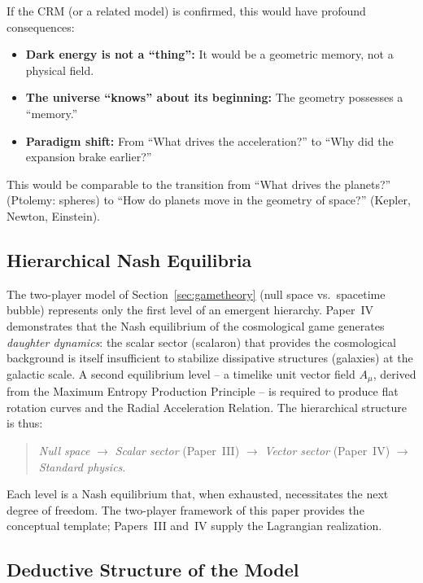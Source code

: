 \documentclass[aps,prd,twocolumn,superscriptaddress,nofootinbib]{revtex4-2}
\begin{document}
If the CRM (or a related model) is confirmed, this would have profound consequences:

\begin{itemize}
\item \textbf{Dark energy is not a ``thing'':} It would be a geometric memory, not a physical field.
\item \textbf{The universe ``knows'' about its beginning:} The geometry possesses a ``memory.''
\item \textbf{Paradigm shift:} From ``What drives the acceleration?'' to ``Why did the expansion brake earlier?''
\end{itemize}

This would be comparable to the transition from ``What drives the planets?'' (Ptolemy: spheres) to ``How do planets move in the geometry of space?'' (Kepler, Newton, Einstein).

\subsection{Hierarchical Nash Equilibria}
\label{subsec:hierarchical_nash}

The two-player model of Section~\ref{sec:gametheory} (null space vs.\ spacetime bubble) represents only the first level of an emergent hierarchy. Paper~IV \cite{Geiger2026d} demonstrates that the Nash equilibrium of the cosmological game generates \emph{daughter dynamics}: the scalar sector (scalaron) that provides the cosmological background is itself insufficient to stabilize dissipative structures (galaxies) at the galactic scale. A second equilibrium level -- a timelike unit vector field $A_\mu$, derived from the Maximum Entropy Production Principle -- is required to produce flat rotation curves and the Radial Acceleration Relation. The hierarchical structure is thus:
\begin{quote}
\textit{Null space} $\to$ \textit{Scalar sector} (Paper~III) $\to$ \textit{Vector sector} (Paper~IV) $\to$ \textit{Standard physics}.
\end{quote}
Each level is a Nash equilibrium that, when exhausted, necessitates the next degree of freedom. The two-player framework of this paper provides the conceptual template; Papers~III and~IV supply the Lagrangian realization.

\subsection{Deductive Structure of the Model}
\label{subsec:deductive}
\end{document}
